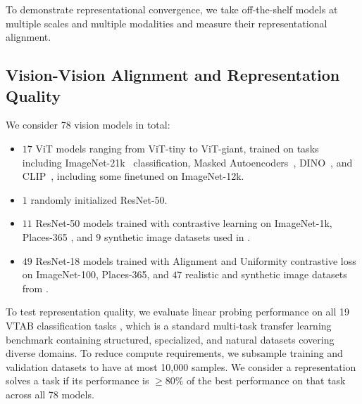 To demonstrate representational convergence, we take off-the-shelf models at multiple scales and multiple modalities and measure their representational alignment. 

\subsection{Vision-Vision Alignment and Representation Quality}
\label{sec:vision-vision-details}

We consider 78 vision models in total: \begin{itemize}
    \item $17$ ViT models ranging from ViT-tiny to ViT-giant, trained on tasks including ImageNet-21k~\cite{dosovitskiy2020image} classification, Masked Autoencoders~\cite{he2021masked}, DINO~\cite{caron2021emerging}, and CLIP~\cite{radford2021learning}, including some finetuned on ImageNet-12k. 
    
    \item $1$ randomly initialized ResNet-50.
    \item $11$ ResNet-50 models trained with contrastive learning on ImageNet-1k, Places-365 \citep{zhou2017places,lopez2020semantic}, and $9$ synthetic image datasets used in \citet{baradad2022procedural}.  
    \item $49$ ResNet-18 models trained with Alignment and Uniformity contrastive loss \citep{tongzhouw2020hypersphere} on ImageNet-100, Places-365, and $47$ realistic and synthetic image datasets from \citet{baradad2021learning}.
\end{itemize}

To test representation quality, we evaluate linear probing performance on all 19 VTAB classification tasks \citep{zhai2019vtab}, which is a standard multi-task transfer learning benchmark containing structured, specialized, and natural datasets covering diverse domains. To reduce compute requirements, we subsample training and validation datasets to have at most 10{,}000 samples. We consider a representation solves a task if its performance is $\geq 80\%$ of the best performance on that task across all 78 models. 

